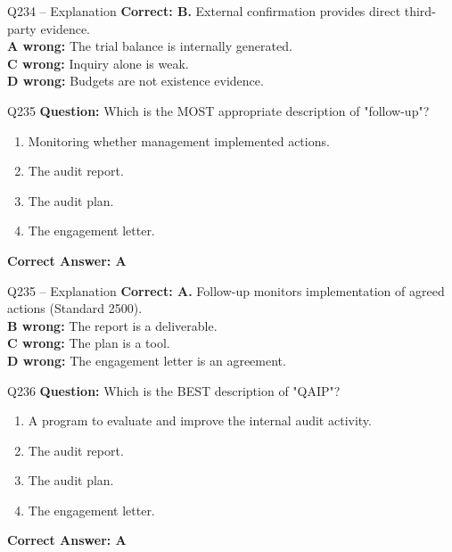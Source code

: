 \documentclass[aspectratio=169,10pt]{beamer}
\begin{document}
	\begin{frame}[t]{Q234 -- Explanation}
		\small
		\textbf{Correct: B.} External confirmation provides direct third-party evidence. \\[4pt]
		\textbf{A wrong:} The trial balance is internally generated. \\[2pt]
		\textbf{C wrong:} Inquiry alone is weak. \\[2pt]
		\textbf{D wrong:} Budgets are not existence evidence.
	\end{frame}
	
	\begin{frame}[t]{Q235}
		\small
		\textbf{Question:} Which is the MOST appropriate description of "follow-up"?
		\begin{enumerate}[label=\Alph*.,itemsep=1pt,topsep=2pt]
			\item Monitoring whether management implemented actions.
			\item The audit report.
			\item The audit plan.
			\item The engagement letter.
		\end{enumerate}
		\vspace{4pt}
		\textbf{Correct Answer: A}
	\end{frame}
	
	\begin{frame}[t]{Q235 -- Explanation}
		\small
		\textbf{Correct: A.} Follow-up monitors implementation of agreed actions (Standard 2500). \\[4pt]
		\textbf{B wrong:} The report is a deliverable. \\[2pt]
		\textbf{C wrong:} The plan is a tool. \\[2pt]
		\textbf{D wrong:} The engagement letter is an agreement.
	\end{frame}
	
	\begin{frame}[t]{Q236}
		\small
		\textbf{Question:} Which is the BEST description of "QAIP"?
		\begin{enumerate}[label=\Alph*.,itemsep=1pt,topsep=2pt]
			\item A program to evaluate and improve the internal audit activity.
			\item The audit report.
			\item The audit plan.
			\item The engagement letter.
		\end{enumerate}
		\vspace{4pt}
		\textbf{Correct Answer: A}
	\end{frame}
	
\end{document}
